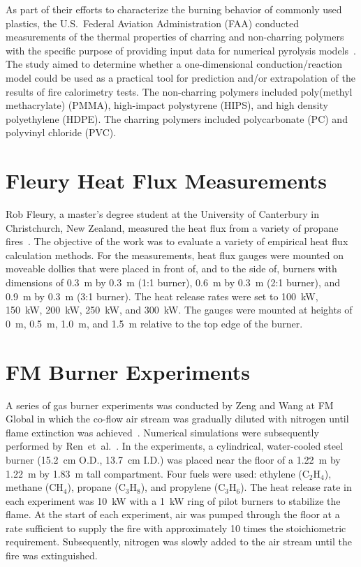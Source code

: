 As part of their efforts to characterize the burning behavior of commonly used plastics, the U.S.~Federal Aviation Administration (FAA) conducted measurements of the thermal properties of charring and non-charring polymers with the specific purpose of providing input data for numerical pyrolysis models~\cite{Stoliarov:CF2009,Stoliarov:CF2010}. The study aimed to determine whether a one-dimensional conduction/reaction model could be used as a practical tool for prediction and/or extrapolation of the results of fire calorimetry tests. The non-charring polymers included poly(methyl methacrylate) (PMMA), high-impact polystyrene (HIPS), and high density polyethylene (HDPE). The charring polymers included polycarbonate (PC) and polyvinyl chloride (PVC).


\section{Fleury Heat Flux Measurements}
\label{Fleury_Heat_Flux_Description}

Rob Fleury, a master's degree student at the University of Canterbury in Christchurch, New Zealand, measured the heat flux from a variety of propane fires~\cite{Fleury:Masters}. The objective of the work was to evaluate a variety of empirical heat flux calculation methods. For the measurements, heat flux gauges were mounted on moveable dollies that were placed in front of, and to the side of, burners with dimensions of 0.3~m by 0.3~m (1:1 burner), 0.6~m by 0.3~m (2:1 burner), and 0.9~m by 0.3~m (3:1 burner). The heat release rates were set to 100~kW, 150~kW, 200~kW, 250~kW, and 300~kW. The gauges were mounted at heights of 0~m, 0.5~m, 1.0~m, and 1.5~m relative to the top edge of the burner.


\section{FM Burner Experiments}
\label{FM_Burner_Description}

A series of gas burner experiments was conducted by Zeng and Wang at FM Global in which the co-flow air stream was gradually diluted with nitrogen until flame extinction was achieved~\cite{Zeng:26ICDERS}. Numerical simulations were subsequently performed by Ren~et~al.~\cite{Ren:CS2018}. In the experiments, a cylindrical, water-cooled steel burner (15.2~cm O.D., 13.7~cm I.D.) was placed near the floor of a 1.22~m by 1.22~m by 1.83~m tall compartment. Four fuels were used: ethylene (C$_2$H$_4$), methane (CH$_4$), propane (C$_3$H$_8$), and propylene (C$_3$H$_6$). The heat release rate in each experiment was 10~kW with a 1~kW ring of pilot burners to stabilize the flame. At the start of each experiment, air was pumped through the floor at a rate sufficient to supply the fire with approximately 10 times the stoichiometric requirement. Subsequently, nitrogen was slowly added to the air stream until the fire was extinguished.

